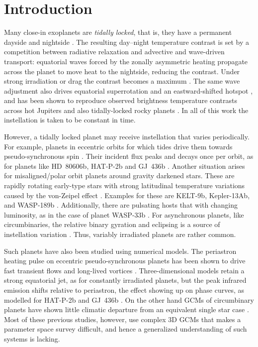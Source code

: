 \documentclass[trackchanges,twocolumn]{aastex7}
\begin{document}
\section{Introduction}
\label{sec:intro}

Many close-in exoplanets are \textit{tidally locked}, that is, they have a permanent dayside and nightside \citep{showman2002atmospheric,PierrehumbertHammond2019}. The
resulting day--night temperature contrast is set by a competition between radiative relaxation and advective and wave-driven transport: equatorial waves forced by the zonally asymmetric heating propagate across the planet to move heat to the nightside, reducing the contrast. Under strong irradiation or drag the contrast becomes a maximum \citep{perez2013atmospheric,komacek2016atmospheric}. The
same wave adjustment also drives equatorial superrotation and an eastward-shifted hotspot \citep{ShowmanPolvani2011,hammond2021rotational}, and has been shown to reproduce observed brightness temperature contrasts across hot Jupiters \citep{komacek2017atmospheric} and also tidally-locked rocky planets \citep{koll2016temperature,koll2022scaling}. In all of this work the instellation is taken to be constant in time.

However, a tidally locked planet may receive instellation that varies periodically. For example, planets in eccentric orbits for which tides drive them towards pseudo-synchronous spin \citep{Hut1981}. Their incident flux peaks and decays once per orbit, as for planets like HD~80606b, HAT-P-2b and GJ~436b \citep{LangtonLaughlin2008,Lewis2013,Lanotte2014}. Another situation arises for misaligned/polar orbit planets around gravity darkened stars. These are rapidly rotating early-type stars with strong latitudinal temperature variations caused by the von-Zeipel effect \citep{vonZeipel1924}. Examples for these are KELT-9b, Kepler-13Ab, and WASP-189b \citep{ahlers2020kelt,Masuda2015,patel2026tess}. Additionally, there are pulsating hosts that with changing luminosity, as in the case of planet WASP-33b \citep{vonEssen2020}. For asynchronous planets, like circumbinaries, the relative binary gyration and eclipsing is a source of instellation variation \citep{may2016examining}. Thus, variably irradiated planets are rather common.

Such planets have also been studied using numerical models. The periastron heating pulse on eccentric pseudo-synchronous planets has been shown to drive fast transient flows and long-lived vortices \citep{LangtonLaughlin2008,Iro2010,mendoncca2021variable}. Three-dimensional models retain a strong equatorial jet, as for constantly irradiated planets, but the peak infrared emission shifts relative to periastron, the effect showing up on phase curves, as modelled for HAT-P-2b and GJ~436b \citep{Kataria2013,Lewis2010,Lewis2014}. On the other hand GCMs of circumbinary planets have shown little climatic departure from an equivalent single star case \citep{may2016examining}. Most of these previous studies, however, use complex 3D GCMs that makes a parameter space survey difficult, and hence a generalized understanding of such systems is lacking. 
\end{document}
